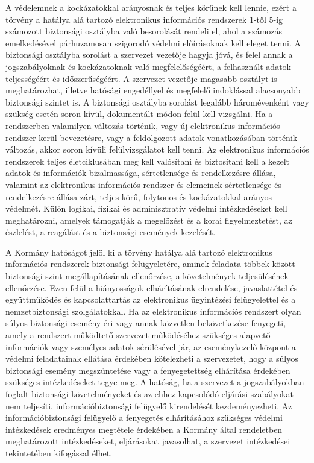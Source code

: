 A védelemnek a kockázatokkal arányosnak és teljes körűnek kell lennie, ezért a törvény a hatálya alá tartozó elektronikus információs rendszerek 1-től 5-ig számozott biztonsági osztályba való besorolását rendeli el, ahol a számozás emelkedésével párhuzamosan szigorodó védelmi előírásoknak kell eleget tenni. A biztonsági osztályba sorolást a szervezet vezetője hagyja jóvá, és felel annak a jogszabályoknak és kockázatoknak való megfelelőségéért, a felhasznált adatok teljességéért és időszerűségéért. A szervezet vezetője magasabb osztályt is meghatározhat, illetve hatósági engedéllyel és megfelelő indoklással alacsonyabb biztonsági szintet is. A biztonsági osztályba sorolást legalább háromévenként vagy szükség esetén soron kívül, dokumentált módon felül kell vizsgálni. Ha a rendszerben valamilyen változás történik, vagy új elektronikus információs rendszer kerül bevezetésre, vagy a feldolgozott adatok vonatkozásában történik változás, akkor soron kívüli felülvizsgálatot kell tenni. Az elektronikus információs rendszerek teljes életciklusában meg kell valósítani és biztosítani kell a kezelt adatok és információk bizalmassága, sértetlensége és rendelkezésre állása, valamint az elektronikus információs rendszer és elemeinek sértetlensége és rendelkezésre állása zárt, teljes körű, folytonos és kockázatokkal arányos védelmét. Külön logikai, fizikai és adminisztratív védelmi intézkedéseket kell meghatározni, amelyek támogatják a megelőzést és a korai figyelmeztetést, az észlelést, a reagálást és a biztonsági események kezelését.

A Kormány hatóságot jelöl ki a törvény hatálya alá tartozó elektronikus információs rendszerek biztonsági felügyeletére, aminek feladata többek között biztonsági szint megállapításának ellenőrzése, a követelmények teljesülésének ellenőrzése. Ezen felül a hiányosságok elhárításának elrendelése, javaslattétel és együttműködés és kapcsolattartás az elektronikus ügyintézési felügyelettel és a nemzetbiztonsági szolgálatokkal. Ha az elektronikus információs rendszert olyan súlyos biztonsági esemény éri vagy annak közvetlen bekövetkezése fenyegeti, amely a rendszert működtető szervezet működéséhez szükséges alapvető információk vagy személyes adatok sérülésével jár, az eseménykezelő központ a védelmi feladatainak ellátása érdekében kötelezheti a szervezetet, hogy a súlyos biztonsági esemény megszüntetése vagy a fenyegetettség elhárítása érdekében szükséges intézkedéseket tegye meg. A hatóság, ha a szervezet a jogszabályokban foglalt biztonsági követelményeket és az ehhez kapcsolódó eljárási szabályokat nem teljesíti, információbiztonsági felügyelő kirendelését kezdeményezheti. Az információbiztonsági felügyelő a fenyegetés elhárításához szükséges védelmi intézkedések eredményes megtétele érdekében a Kormány által rendeletben meghatározott intézkedéseket, eljárásokat javasolhat, a szervezet intézkedései tekintetében kifogással élhet.

